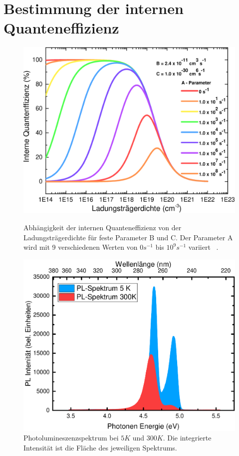 \newpage
\section{Bestimmung der internen Quanteneffizienz}
\thispagestyle{fancy}
\begin{figure}[h]
    \centering
    \begin{minipage}[t]{0.49\linewidth}
        \centering
        \includegraphics[width=\linewidth]{Bilder/IQEohneDotierungVerschAParams.pdf}
        \caption{Abhängigkeit der internen Quanteneffizienz von der Ladungsträgerdichte für feste Parameter B und C. Der Parameter A wird mit 9 verschiedenen Werten von $0 s^{-1} $ bis $10^9 s^{-1}$ variiert ~\cite{semreich}.}
        \label{fig:abha}
    \end{minipage}
    \hfill
    \begin{minipage}[t]{0.49\linewidth}
        \centering
        \includegraphics[width=\linewidth]{Bilder/BeispielIQEbestimmen.pdf}
        \caption{Photolumineszenzspektrum bei $5K$ und $300K$. Die integrierte Intensität ist die Fläche des jeweiligen Spektrums.}
        \label{fig:beispielint}
    \end{minipage}%
\end{figure}
